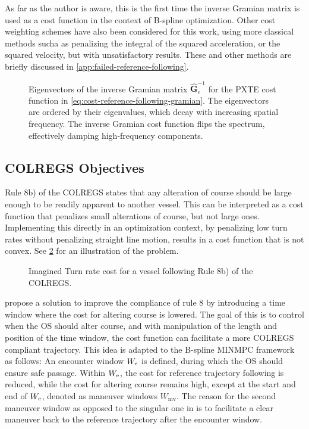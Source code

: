 As far as the author is aware, this is the first time the inverse Gramian matrix is used as a cost function in the context of B-spline optimization.
Other cost weighting schemes have also been considered for this work, using more classical methods sucha as penalizing the integral of the squared acceleration, or the squared velocity, but with unsatisfactory results. These and other methods are briefly discussed in \cref{app:failed-reference-following}.

\begin{figure}
    \centering
    
    \caption{Eigenvectors of the inverse Gramian matrix $\mathbf{\hat G}_e^{-1}$ for the PXTE cost function in \cref{eq:cost-reference-following-gramian}. The eigenvectors are ordered by their eigenvalues, which decay with increasing spatial frequency. The inverse Gramian cost function flips the spectrum, effectively damping high‐frequency components.}    
    \label{fig:inverse-gramian-eigenvectors}
\end{figure}


\FloatBarrier
\subsection{COLREGS Objectives}\label{sec:colregs-objectives}
Rule 8b) of the COLREGS states that any alteration of course should be large enough to be readily apparent to another vessel. 
This can be interpreted as a cost function that penalizes small alterations of course, but not large ones. 
Implementing this directly in an optimization context, by penalizing low turn rates without penalizing straight line motion, results in a cost function that is not convex. 
See \cref{fig:turn-rate-cost} for an illustration of the problem.

\begin{figure}
    \centering
    
    \caption{Imagined Turn rate cost for a vessel following Rule 8b) of the COLREGS.}
    \label{fig:turn-rate-cost}
\end{figure}

\cite{Thyri2022-MPC} propose a solution to improve the compliance of rule 8 by introducing a time window where the cost for altering course is lowered. The goal of this is to control when the OS should alter course, and with manipulation of the length and position of the time window, the cost function can facilitate a more COLREGS compliant trajectory. This idea is adapted to the B-spline MINMPC framework as follows:
An encounter window $W_\text e$ is defined, during which the OS should ensure safe passage. Within $W_\text e$, the cost for reference trajectory following is reduced, while the cost for altering course remains high, except at the start and end of $W_\text e$, denoted as maneuver windows $W_\text{mv}$. 
The reason for the second maneuver window as opposed to the singular one in \cite{Thyri2022-MPC} is to facilitate a clear maneuver back to the reference trajectory after the encounter window.

